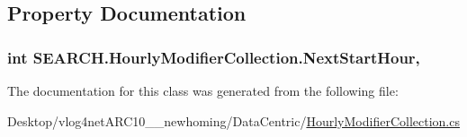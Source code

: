 \subsection{Property Documentation}
\hypertarget{class_s_e_a_r_c_h_1_1_hourly_modifier_collection_a6833cba60a501f4c5e22fd78636c6ade}{
\subsubsection[{Next\-Start\-Hour}]{\setlength{\rightskip}{0pt plus 5cm}int S\-E\-A\-R\-C\-H.\-Hourly\-Modifier\-Collection.\-Next\-Start\-Hour\hspace{0.3cm}{\ttfamily [get]}, {\ttfamily [set]}}}\label{class_s_e_a_r_c_h_1_1_hourly_modifier_collection_a6833cba60a501f4c5e22fd78636c6ade}


The documentation for this class was generated from the following file\-:\begin{DoxyCompactItemize}
\item 
Desktop/vlog4net\-A\-R\-C10\-\_\-\_\-newhoming/\-Data\-Centric/\hyperlink{_hourly_modifier_collection_8cs}{Hourly\-Modifier\-Collection.\-cs}\end{DoxyCompactItemize}
